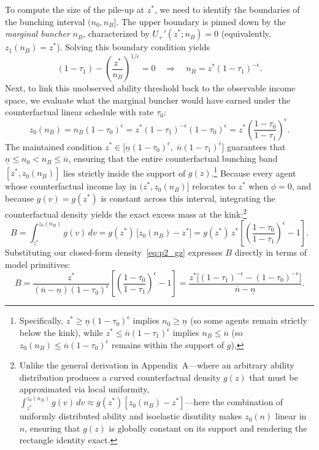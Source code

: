 To compute the size of the pile-up at $z^*$, we need to identify the boundaries of the bunching interval $(n_0, n_B]$. The upper boundary is pinned down by the \emph{marginal buncher} $n_B$, characterized by $U_+'(z^*; n_B) = 0$ (equivalently, $z_1(n_B) = z^*$). Solving this boundary condition yields
\begin{equation}
(1-\tau_1) - \left(\frac{z^*}{n_B}\right)^{1/\epsilon} = 0
\quad\Longrightarrow\quad
n_B = z^*(1-\tau_1)^{-\epsilon}.
\label{eq:p2_nB}
\end{equation}
Next, to link this unobserved ability threshold back to the observable income space, we evaluate what the marginal buncher would have earned under the counterfactual linear schedule with rate $\tau_0$:
\begin{equation}
z_0(n_B) = n_B(1-\tau_0)^\epsilon = z^*(1-\tau_1)^{-\epsilon}(1-\tau_0)^\epsilon = z^*\left(\frac{1-\tau_0}{1-\tau_1}\right)^\epsilon.
\label{eq:p2_z0nB}
\end{equation}
The maintained condition $z^* \in \big[\underline{n}(1-\tau_0)^\epsilon,\; \overline{n}(1-\tau_1)^\epsilon\big]$ guarantees that $\underline{n} \le n_0 < n_B \le \overline{n}$, ensuring that the entire counterfactual bunching band $[z^*, z_0(n_B)]$ lies strictly inside the support of $g(z)$.\footnote{Specifically, $z^* \ge \underline{n}(1-\tau_0)^\epsilon$ implies $n_0 \ge \underline{n}$ (so some agents remain strictly below the kink), while $z^* \le \overline{n}(1-\tau_1)^\epsilon$ implies $n_B \le \overline{n}$ (so $z_0(n_B) \le \overline{n}(1-\tau_0)^\epsilon$ remains within the support of $g$).} Because every agent whose counterfactual income lay in $(z^*, z_0(n_B)]$ relocates to $z^*$ when $\phi = 0$, and because $g(v) = g(z^*)$ is constant across this interval, integrating the counterfactual density yields the exact excess mass at the kink:\footnote{Unlike the general derivation in Appendix~A---where an arbitrary ability distribution produces a curved counterfactual density $g(z)$ that must be approximated via local uniformity, $\int_{z^*}^{z_0(n_B)} g(v)\,dv \approx g(z^*)[z_0(n_B)-z^*]$---here the combination of uniformly distributed ability and isoelastic disutility makes $z_0(n)$ linear in $n$, ensuring that $g(z)$ is globally constant on its support and rendering the rectangle identity exact.}
\begin{equation}
B = \int_{z^*}^{z_0(n_B)} g(v)\,dv
= g(z^*)\,\big[z_0(n_B) - z^*\big]
= g(z^*)\,z^*\left[\left(\frac{1-\tau_0}{1-\tau_1}\right)^\epsilon - 1\right].
\label{eq:p2_B_frictionless}
\end{equation}
Substituting our closed-form density~\eqref{eq:p2_gz} expresses $B$ directly in terms of model primitives:
\begin{equation}
B = \frac{z^*}{(\overline{n}-\underline{n})(1-\tau_0)^\epsilon}\left[\left(\frac{1-\tau_0}{1-\tau_1}\right)^\epsilon - 1\right]
= \frac{z^*\big[(1-\tau_1)^{-\epsilon} - (1-\tau_0)^{-\epsilon}\big]}{\overline{n}-\underline{n}}.
\end{equation}

